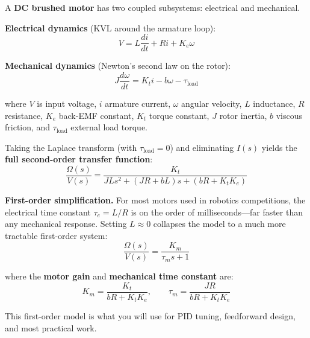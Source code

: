 A \textbf{DC brushed motor} has two coupled subsystems: electrical and mechanical.

\textbf{Electrical dynamics} (KVL around the armature loop):
\begin{equation}
V = L\frac{di}{dt} + Ri + K_e\omega
\end{equation}

\textbf{Mechanical dynamics} (Newton's second law on the rotor):
\begin{equation}
J\frac{d\omega}{dt} = K_t i - b\omega - \tau_{\text{load}}
\end{equation}

where $V$ is input voltage, $i$ armature current, $\omega$ angular velocity, $L$ inductance, $R$ resistance, $K_e$ back-EMF constant, $K_t$ torque constant, $J$ rotor inertia, $b$ viscous friction, and $\tau_{\text{load}}$ external load torque.

Taking the Laplace transform (with $\tau_{\text{load}} = 0$) and eliminating $I(s)$ yields the \textbf{full second-order transfer function}:
\begin{equation}
\frac{\Omega(s)}{V(s)} = \frac{K_t}{JLs^2 + (JR + bL)s + (bR + K_t K_e)}
\end{equation}

\textbf{First-order simplification.} For most motors used in robotics competitions, the electrical time constant $\tau_e = L/R$ is on the order of milliseconds---far faster than any mechanical response. Setting $L \approx 0$ collapses the model to a much more tractable first-order system:
\begin{equation}
\frac{\Omega(s)}{V(s)} = \frac{K_m}{\tau_m s + 1}
\end{equation}

where the \textbf{motor gain} and \textbf{mechanical time constant} are:
\begin{equation}
K_m = \frac{K_t}{bR + K_t K_e}, \qquad \tau_m = \frac{JR}{bR + K_t K_e}
\end{equation}

This first-order model is what you will use for PID tuning, feedforward design, and most practical work.

